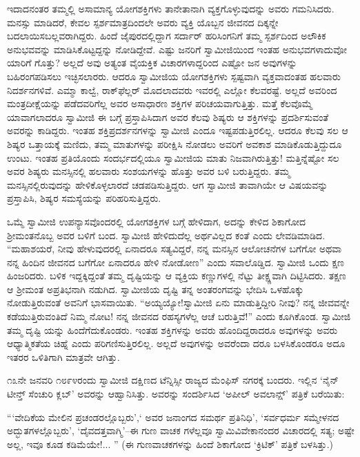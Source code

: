 ಇದಾದನಂತರ ತಮ್ಮಲ್ಲಿ ಅಸಾಮಾನ್ಯ ಯೋಗಶಕ್ತಿಗಳು ತಾನೇತಾನಾಗಿ ವ್ಯಕ್ತಗೊಳ್ಳುವುದನ್ನು ಅವರು ಗಮನಿಸಿದರು. ಮನಸ್ಸು ಮಾಡಿದರೆ, ಕೇವಲ ಸ್ಪರ್ಶಮಾತ್ರದಿಂದಲೇ ಅವರು ವ್ಯಕ್ತಿ ಯೊಬ್ಬನ ಜೀವನದ ದಿಕ್ಕನ್ನೇ ಬದಲಾಯಿಸಬಲ್ಲವರಾಗಿದ್ದರು. ಹಿಂದೆ ಜೈಪುರದಲ್ಲಿದ್ದಾಗ ಸರ್ದಾರ್ ಹರಿಸಿಂಗನಿಗೆ ತಮ್ಮ ಸ್ಪರ್ಶದಿಂದ ಅಲೌಕಿಕ ಅನುಭವವನ್ನು ಮಾಡಿಸಿಕೊಟ್ಟದ್ದನ್ನು ನೋಡಿದ್ದೇವೆ. ಎಷ್ಟು ಜನರಿಗೆ ಸ್ವಾಮೀಜಿಯಿಂದ ಇಂತಹ ಅನುಭವಗಳಾದುವೋ ಯಾರಿಗೆ ಗೊತ್ತು? ಅಲ್ಲದೆ ಅವು ಅತ್ಯಂತ ವೈಯಕ್ತಿಕ ವಿಚಾರಗಳಾದ್ದರಿಂದ ಎಷ್ಟೋ ಜನ ಅವುಗಳನ್ನು ಬಹಿರಂಗಪಡಿಸಲು ಇಚ್ಛಿಸಲಾರರು. ಆದರೂ ಸ್ವಾಮೀಜಿಯ ಯೋಗಶಕ್ತಿಗಳು ಸ್ಪಷ್ಟವಾಗಿ ವ್ಯಕ್ತವಾದಂತಹ ಹಲವಾರು ನಿದರ್ಶನಗಳಿವೆ. ಎಮ್ಮಾ ಕಾಲ್ವೆ, ರಾಕ್​ಫೆಲ್ಲರ್ ಮೊದಲಾದವರು ಇವರಲ್ಲಿ ಎಲ್ಲೋ ಕೆಲವರಷ್ಟೆ. ಅಲ್ಲದೆ ಅವರಿಂದ ಮಂತ್ರದೀಕ್ಷೆಯನ್ನು ಪಡೆದವರಿಗೆಲ್ಲ ಅವರ ಅಸಾಧಾರಣ ಶಕ್ತಿಗಳ ಪರಿಚಯವಾಗುತ್ತಿತ್ತು. ಮತ್ತೆ ಕೆಲವೊಮ್ಮೆ ಯಾವಾಗಲಾದರೂ ಸ್ವಾಮೀಜಿ ಈ ಬಗ್ಗೆ ಪ್ರಸ್ತಾಪಿಸಿದಾಗ ಅವರ ಕೆಲವು ಶಿಷ್ಯರು ಆ ಶಕ್ತಿಗಳನ್ನು ಪ್ರದರ್ಶಿಸುವಂತೆ ಅವರನ್ನು ಕಾಡಿದ್ದರು. ಇಂತಹ ಶಕ್ತಿಪ್ರದರ್ಶನಗಳನ್ನು ಸ್ವಾಮೀಜಿ ಎಂದೂ ಇಷ್ಟಪಡುತ್ತಿರಲಿಲ್ಲ. ಆದರೂ ಕೆಲವು ಸಲ ಆ ಶಿಷ್ಯರ ಒತ್ತಾಯಕ್ಕೆ ಮಣಿದು, ತಮ್ಮ ಮಾತುಗಳನ್ನು ಪರೀಕ್ಷಿಸಿ ನೋಡಲು ಅವರಿಗೆ ಅವಕಾಶ ಮಾಡಿಕೊಡುತ್ತಿದ್ದುದೂ ಉಂಟು. ಇಂತಹ ಪ್ರತಿಯೊಂದು ಸಂದರ್ಭದಲ್ಲಿಯೂ ಸ್ವಾಮೀಜಿಯ ಮಾತು ನಿಜವಾಗಿರುತ್ತಿತ್ತು! ಮತ್ತಿನ್ನೆಷ್ಟೋ ಸಲ ಅವರ ಶಿಷ್ಯರು ಮನಸ್ಸಿನಲ್ಲಿ ಹಲವಾರು ಸಂಶಯಗಳನ್ನು ಹೊತ್ತು ಅವರ ಬಳಿ ಬರುತ್ತಿದ್ದರು. ತಮ್ಮ ಮನಸ್ಸಿನಲ್ಲಿರುವುದನ್ನು ಹೇಳಿಕೊಳ್ಳಲಾರದೆ ಚಡಪಡಿಸುತ್ತಿದ್ದರು. ಆಗ ಸ್ವಾಮೀಜಿ ತಾವಾಗಿಯೇ ಆ ವಿಷಯವನ್ನು ಪ್ರಸ್ತಾಪಿಸಿ, ಶಿಷ್ಯರ ಸಮಸ್ಯೆಯನ್ನು ಪರಿಹರಿಸುತ್ತಿದ್ದರು.

ಒಮ್ಮೆ ಸ್ವಾಮೀಜಿ ಉಪನ್ಯಾಸವೊಂದರಲ್ಲಿ ಯೋಗಶಕ್ತಿಗಳ ಬಗ್ಗೆ ಹೇಳಿದಾಗ, ಅದನ್ನು ಕೇಳಿದ ಶಿಕಾಗೋದ ಶ್ರೀಮಂತನೊಬ್ಬ ಅವರ ಬಳಿಗೆ ಬಂದ. ಸ್ವಾಮೀಜಿ ಹೇಳಿದುದೆಲ್ಲ ಅರ್ಥವಿಲ್ಲದ ಕಂತೆ ಎಂದು ಲೇವಡಿಮಾಡಿದ. “ಮಹಾಶಯರೆ, ನೀವು ಹೇಳುವುದರಲ್ಲಿ ಏನಾದರೂ ಸತ್ಯವಿದ್ದರೆ, ನನ್ನ ಮನಸ್ಸಿನ ಆಲೋಚನೆಗಳ ಬಗೆಗೋ ಅಥವಾ ನನ್ನ ಹಿಂದಿನ ಜೀವನದ ಬಗೆಗೋ ಏನಾದರೂ ಹೇಳಿ ನೋಡೋಣ” ಎಂದು ಸವಾಲೊಡ್ಡಿದ. ಸ್ವಾಮೀಜಿ ಒಂದು ಕ್ಷಣ ಹಿಂಜರಿದರು. ಬಳಿಕ ಇದ್ದಕ್ಕಿದ್ದಂತೆ ತಮ್ಮ ದೃಷ್ಟಿಯನ್ನು ಆ ವ್ಯಕ್ತಿಯ ಕಣ್ಣುಗಳಲ್ಲಿ ನೆಟ್ಟು ತೀಕ್ಷ್ಣವಾಗಿ ದಿಟ್ಟಿಸಿದರು. ತಕ್ಷಣ ಆ ಶ್ರೀಮಂತ ಅಪ್ರತಿಭನಾಗಿ ನಡುಗಿದ. ಸ್ವಾಮೀಜಿಯ ದೃಷ್ಟಿ ತನ್ನ ಅಂತರಂಗವನ್ನು ಭೇದಿಸಿ ಒಳಹೊಕ್ಕು ನೋಡುತ್ತಿರುವಂತೆ ಅವನಿಗೆ ಭಾಸವಾಯಿತು. “ಅಯ್ಯಯ್ಯೋ!ಸ್ವಾಮೀಜಿ ಏನು ಮಾಡುತ್ತಿದ್ದೀರಿ ನೀವು? ನನ್ನ ಜೀವವನ್ನೇ ಕಡೆಯುತ್ತಿರುವಂತಿದೆ ನಿಮ್ಮ ನೋಟ! ನನ್ನ ಜೀವನದ ರಹಸ್ಯಗಳೆಲ್ಲ ಆಚೆ ಬರುತ್ತಿವೆ!” ಎಂದು ಕೂಗಿಕೊಂಡ. ಸ್ವಾಮೀಜಿ ತಮ್ಮ ದೃಷ್ಟಿ ಯನ್ನು ಹಿಂದೆಗೆದುಕೊಂಡರು. ಇಂತಹ ಶಕ್ತಿಗಳನ್ನು ಅವರು ಹೊಂದಿದ್ದರಾದರೂ ಅವುಗಳನ್ನು ಅವರು ಆಧ್ಯಾತ್ಮಿಕತೆಯ ಚಿಹ್ನೆ ಎಂದು ಪರಿಗಣಿಸುತ್ತಿರಲಿಲ್ಲ. ಅಲ್ಲದೆ ಅವುಗಳನ್ನು ಅವರೆಂದಾ ದರೂ ಬಳಸಿಕೊಂಡರೂ ಅದೂ ಇತರರ ಒಳಿತಿಗಾಗಿ ಮಾತ್ರವೇ ಆಗಿತ್ತು.

೧೩ನೇ ಜನವರಿ ೧೮೯೪ರಂದು ಸ್ವಾಮೀಜಿ ದಕ್ಷಿಣದ ಟೆನ್ನಿಸ್ಸೀ ರಾಜ್ಯದ ಮೆಂಫಿಸ್ ನಗರಕ್ಕೆ ಬಂದರು. ಇಲ್ಲಿನ ‘ನೈನ್​ಟೀನ್ತ್ ಸೆಂಚುರಿ ಕ್ಲಬ್​’ ಅವರನ್ನು ಆಹ್ವಾನಿಸಿತ್ತು. ಅವರನ್ನು ಸಂದರ್ಶಿಸಿದ ‘ಅಪೀಲ್ ಅವಲಾನ್ಷ್​’ ಪತ್ರಿಕೆ ಬರೆಯಿತು:

“‘ವೇದಿಕೆಯ ಮೇಲಿನ ಪ್ರಚಂಡರಲ್ಲೊಬ್ಬರು’,‘ ಅವರ ಜನಾಂಗದ ಸಮರ್ಥ ಪ್ರತಿನಿಧಿ’, ‘ಸರ್ವಧರ್ಮ ಸಮ್ಮೇಳನದ ಅದ್ಭುತಗಳಲ್ಲೊಬ್ಬರು’, ‘ದೈವದತ್ತವಾಗ್ಮಿ’–ಈ ಗುಣ ವಾಚಕ ಗಳೆಲ್ಲವೂ ಸ್ವಾಮಿವಿವೇಕಾನಂದರ ವಿಚಾರದಲ್ಲಿ ಸತ್ಯ; ಅಷ್ಟೇ ಅಲ್ಲ, ಇವೂ ಕೂಡ ಕಡಿಮೆಯೇ!... ” (ಈ ಗುಣವಾಚಕಗಳನ್ನು ಹಿಂದೆ ಶಿಕಾಗೋದ ‘ಕ್ರಿಟಿಕ್​’ ಪತ್ರಿಕೆ ಬಳಸಿತ್ತು.)

